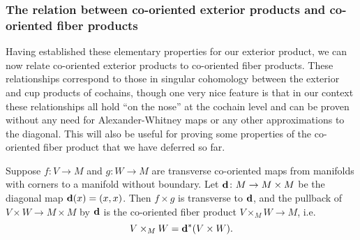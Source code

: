 \subsubsection{The relation between co-oriented exterior products and co-oriented fiber products}

Having established these elementary properties for our exterior product, we can now relate co-oriented exterior products to co-oriented fiber products.
These relationships correspond to those in singular cohomology between the exterior and cup products of cochains, though one very nice feature is that in our context these relationships all hold ``on the nose'' at the cochain level and can be proven without any need for Alexander-Whitney maps or any other approximations to the diagonal.
This will also be useful for proving some properties of the co-oriented fiber product that we have deferred so far.

\begin{proposition}\label{P: cross to cup}
	Suppose $f \colon V \to M$ and $g \colon W \to M$ are transverse co-oriented maps from manifolds with corners to a manifold without boundary.
	Let $\mathbf{d} \colon M \to M \times M$ be the diagonal map $\mathbf{d}(x) = (x,x)$.
	Then $f \times g$ is transverse to $\mathbf{d}$, and the pullback of $V \times W \to M \times M$ by $\mathbf{d}$ is the co-oriented fiber product $V \times_M W \to M$, i.e.\ $$V \times_M W = \mathbf{d}^*(V \times W).$$
\end{proposition}

